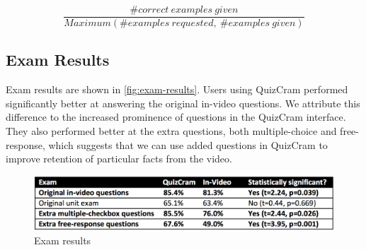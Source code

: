 \documentclass{chi-ext}
\begin{document}
\[ \frac{\# correct\ examples\ given}{Maximum(\# examples\ requested,\ \# examples\ given)} \]



\subsection{Exam Results}

Exam results are shown in \autoref{fig:exam-results}.  Users using QuizCram performed significantly better at answering the original in-video questions. We attribute this difference to the increased prominence of questions in the QuizCram interface. They also performed better at the extra questions, both multiple-choice and free-response, which suggests that we can use added questions in QuizCram to improve retention of particular facts from the video.

\begin{figure}
\centering
\includegraphics[width=1.0\columnwidth]{exam-results}
\caption{Exam results}
\label{fig:exam-results}
\end{figure}

\end{document}
